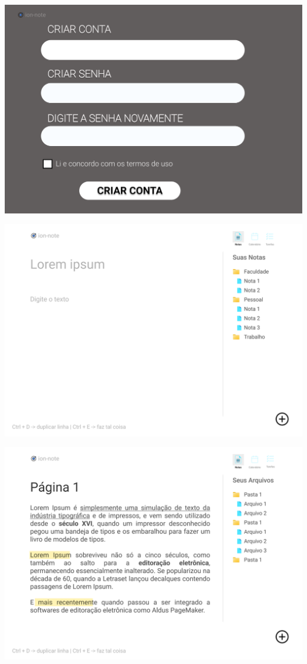 \documentclass[
	12pt,				%
	openright,			%
	oneside,			    %
	a4paper,				%
	english,			%
	french,			%
	spanish,			%
	brazil			%
	]{abntex2}
\begin{document}
\includegraphics[scale=0.3]{Imagens/Criar conta.png}

\includegraphics[scale=0.3]{Imagens/Adicionar nota.png}

\includegraphics[scale=0.3]{Imagens/Nota preenchida.png}
\end{document}
